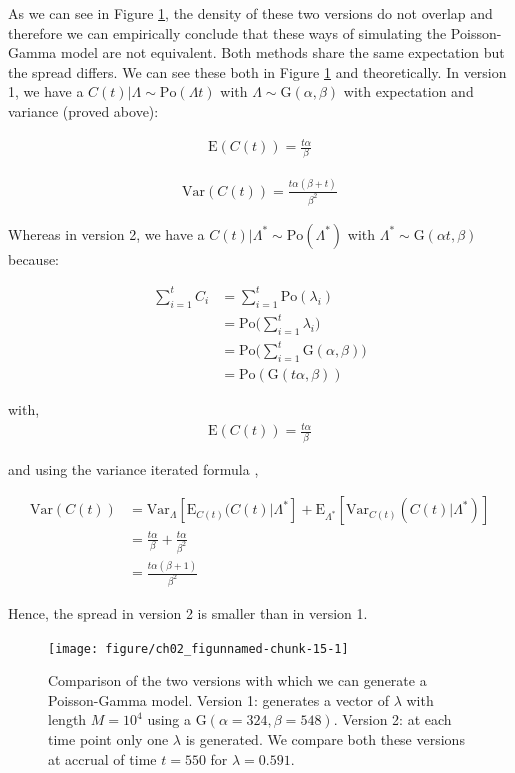 As we can see in Figure \ref{fig:2_12}, the density of these two versions do not overlap and therefore we can empirically conclude that these ways of simulating the Poisson-Gamma model are not equivalent. Both methods share the same expectation but the spread differs. We can see these both in Figure \ref{fig:2_12} and theoretically. In version 1, we have a $C(t)|\Lambda\sim\textrm{Po}(\Lambda t)$ with $\Lambda\sim\textrm{G}(\alpha,\beta)$ with expectation and variance (proved above):


\begin{align*}
\textrm{E}(C(t))=\frac{t\alpha}{\beta}
\end{align*}

\begin{align*}
\textrm{Var}(C(t))=\frac{t\alpha(\beta+t)}{\beta^2}
\end{align*}

Whereas in version 2, we have a $C(t)|\Lambda^*\sim\textrm{Po}(\Lambda^*)$ with $\Lambda^*\sim\textrm{G}(\alpha t,\beta)$ because:

\begin{align*}
\sum_{i=1}^t C_i &= \sum_{i=1}^t \textrm{Po}(\lambda_i)\\
&=\textrm{Po}\Bigg(\sum_{i=1}^t \lambda_i\Bigg)\\
&=\textrm{Po}\Bigg(\sum_{i=1}^t \textrm{G}(\alpha,\beta)\Bigg)\\
&=\textrm{Po}(\textrm{G}(t\alpha,\beta))
\end{align*}

with,
\begin{align*}
\textrm{E}(C(t))=\frac{t\alpha}{\beta}
\end{align*}

and using the variance iterated formula \citep{held2014applied},

\begin{align*}
\textrm{Var}(C(t))&= \textrm{Var}_{\Lambda}[\textrm{E}_{C(t)} (C(t)|\Lambda^*] + \textrm{E}_{\Lambda^*}[\textrm{Var}_{C(t)}(C(t)|\Lambda^*)]\\
&=\frac{t\alpha}{\beta}+\frac{t\alpha}{\beta^2}\\
&=\frac{t\alpha(\beta+1)}{\beta^2}
\end{align*}

Hence, the spread in version 2 is smaller than in version 1.


\begin{figure}
\begin{knitrout}
\color{fgcolor}

{\centering \texttt{[image: figure/ch02\_figunnamed-chunk-15-1]} 

}


\end{knitrout}
  \caption{Comparison of the two versions with which we can generate a Poisson-Gamma model. Version 1: generates a vector of $\lambda$ with length $M=10^4$ using a $\textrm{G}(\alpha = 324, \beta = 548)$. Version 2: at each time point only one $\lambda$ is generated. We compare both these versions at accrual of time $t=550$ for $\lambda=0.591$.}
  \label{fig:2_12}
\end{figure}

